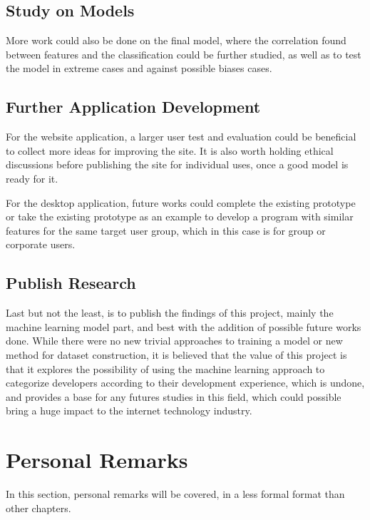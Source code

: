 \documentclass{report}
\begin{document}
\subsection{Study on Models}

More work could also be done on the final model, where the correlation found between features and the classification could be further studied, as well as to test the model in extreme cases and against possible biases cases.

\subsection{Further Application Development}

For the website application, a larger user test and evaluation could be beneficial to collect more ideas for improving the site. It is also worth holding ethical discussions before publishing the site for individual uses, once a good model is ready for it.

For the desktop application, future works could complete the existing prototype or take the existing prototype as an example to develop a program with similar features for the same target user group, which in this case is for group or corporate users.

\subsection{Publish Research}

Last but not the least, is to publish the findings of this project, mainly the machine learning model part, and best with the addition of possible future works done. While there were no new trivial approaches to training a model or new method for dataset construction, it is believed that the value of this project is that it explores the possibility of using the machine learning approach to categorize developers according to their development experience, which is undone, and provides a base for any futures studies in this field, which could possible bring a huge impact to the internet technology industry.

\section{Personal Remarks}

In this section, personal remarks will be covered, in a less formal format than other chapters.
\end{document}
